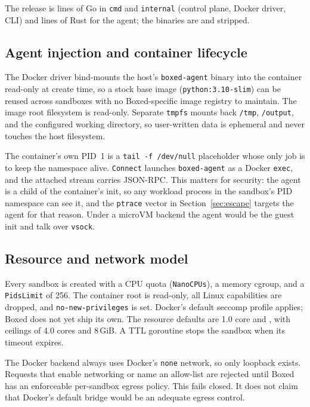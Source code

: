 \documentclass[conference]{IEEEtran}
\begin{document}
The release is \BoxedGoLOC{} lines of Go in \texttt{cmd} and
\texttt{internal} (control plane, Docker driver, CLI) and \BoxedRustLOC{}
lines of Rust for the agent; the binaries are \BoxedServerBinSize{} and
\BoxedAgentBinSize{} stripped.

\subsection{Agent injection and container lifecycle}
The Docker driver bind-mounts the host's \texttt{boxed-agent} binary into the
container read-only at create time, so a stock base image
(\texttt{python:3.10-slim}) can be reused across sandboxes with no
Boxed-specific image registry to maintain. The image root filesystem is
read-only. Separate \texttt{tmpfs} mounts back \texttt{/tmp},
\texttt{/output}, and the configured working directory, so user-written data
is ephemeral and never touches the host filesystem.

The container's own PID~1 is a \texttt{tail -f /dev/null} placeholder
whose only job is to keep the namespace alive. \texttt{Connect} launches
\texttt{boxed-agent} as a Docker \texttt{exec}, and the attached stream
carries JSON-RPC. This matters for security: the agent is a child of the
container's init, so any workload process in the sandbox's PID namespace can
see it, and the \texttt{ptrace} vector in Section~\ref{sec:escape}
targets the agent for that reason. Under a microVM backend the
agent would be the guest init and talk over \texttt{vsock}.

\subsection{Resource and network model}\label{sec:hardening}
Every sandbox is created with a CPU quota (\texttt{NanoCPUs}), a memory
cgroup, and a \texttt{PidsLimit} of 256. The container root is read-only,
all Linux capabilities are dropped, and \texttt{no-new-privileges} is set.
Docker's default seccomp profile applies; Boxed does not yet ship its own.
The resource defaults are 1.0 core and \BoxedMemDefault{}, with ceilings of
4.0 cores and 8\,GiB. A TTL goroutine stops the sandbox when its timeout
expires.

The Docker backend always uses Docker's \texttt{none} network, so only
loopback exists. Requests that enable networking or name an allow-list are
rejected until Boxed has an enforceable per-sandbox egress policy. This
fails closed. It does not claim that Docker's default bridge would be an
adequate egress control.
\end{document}
